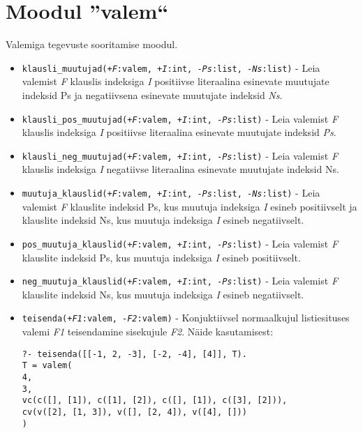 \section{Moodul ''valem``}

Valemiga tegevuste sooritamise moodul.

\begin{itemize}
\item {\tt klausli\_muutujad(+{\it F}:valem, +{\it I}:int, -{\it Ps}:list, -{\it Ns}:list)} - Leia valemist {\it F} klauslis indeksiga {\it I} positiivse
literaalina esinevate muutujate indeksid Ps
ja negatiivsena esinevate muutujate indeksid {\it Ns}.

\item {\tt klausli\_pos\_muutujad(+{\it F}:valem, +{\it I}:int, -{\it Ps}:list)} - Leia valemist {\it F} klauslis indeksiga {\it I} positiivse
literaalina esinevate muutujate indeksid {\it Ps}.

\item {\tt klausli\_neg\_muutujad(+{\it F}:valem, +{\it I}:int, -{\it Ps}:list)} - Leia valemist {\it F} klauslis indeksiga {\it I} negatiivse
literaalina esinevate muutujate indeksid Ns.

\item {\tt muutuja\_klauslid(+{\it F}:valem, +{\it I}:int, -{\it Ps}:list, -{\it Ns}:list)} - Leia valemist {\it F} klauslite indeksid Ps,
kus muutuja indeksiga {\it I} esineb positiivselt ja klauslite
indeksid Ns, kus muutuja indeksiga {\it I} esineb negatiivselt.

\item {\tt pos\_muutuja\_klauslid(+{\it F}:valem, +{\it I}:int, -{\it Ps}:list)} - Leia valemist {\it F} klauslite indeksid Ps,
kus muutuja indeksiga {\it I} esineb positiivselt.

\item {\tt neg\_muutuja\_klauslid(+{\it F}:valem, +{\it I}:int, -{\it Ps}:list)} - Leia valemist {\it F} klauslite indeksid Ns,
kus muutuja indeksiga {\it I} esineb negatiivselt.

\item {\tt teisenda(+{\it F1}:valem, -{\it F2}:valem)} - Konjuktiivsel normaalkujul listiesituses valemi {\it F1} teisendamine sisekujule {\it F2}.
Näide kasutamisest:

\begin{verbatim}
?- teisenda([[-1, 2, -3], [-2, -4], [4]], T).
T = valem(
4,
3,
vc(c([], [1]), c([1], [2]), c([], [1]), c([3], [2])),
cv(v([2], [1, 3]), v([], [2, 4]), v([4], []))
)
\end{verbatim}


\end{itemize}

